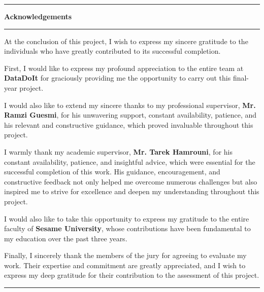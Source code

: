 \begingroup
{}

\clearpage
\noindent
\begin{minipage}{0.06\textwidth}
	\vspace{0.1cm}
	{\color{black}\rule{\linewidth}{1.4cm}}
\end{minipage}%
\hfill
\begin{minipage}{0.88\textwidth}
	{\raggedright\LARGE\bfseries Acknowledgements\\[6pt]}
	\noindent\rule{0.95\linewidth}{0.5pt}
\end{minipage}

\vspace{2.2cm}
\begingroup
\fontsize{12pt}{18pt}\selectfont
\setlength{\parindent}{1.5em}
\setlength{\parskip}{16pt plus 2pt minus 2pt}

At the conclusion of this project, I wish to express my sincere gratitude to the individuals who have greatly contributed to its successful completion.

First, I would like to express my profound appreciation to the entire team at \textbf{DataDoIt} for graciously providing me the opportunity to carry out this final-year project.

I would also like to extend my sincere thanks to my professional supervisor, \textbf{Mr. Ramzi Guesmi}, for his unwavering support, constant availability, patience, and his relevant and constructive guidance, which proved invaluable throughout this project.

I warmly thank my academic supervisor, \textbf{Mr. Tarek Hamrouni}, for his constant availability, patience, and insightful advice, which were essential for the successful completion of this work. His guidance, encouragement, and constructive feedback not only helped me overcome numerous challenges but also inspired me to strive for excellence and deepen my understanding throughout this project.

I would also like to take this opportunity to express my gratitude to the entire faculty of \textbf{Sesame University}, whose contributions have been fundamental to my education over the past three years.

Finally, I sincerely thank the members of the jury for agreeing to evaluate my work. Their expertise and commitment are greatly appreciated, and I wish to express my deep gratitude for their contribution to the assessment of this project.

\endgroup

\vfill
\begin{center}
    \noindent\rule{0.3\textwidth}{0.4pt}
\end{center}
\endgroup
